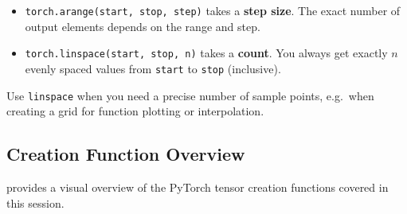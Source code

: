 \documentclass[12pt,a4paper]{article}
\newcommand{\tbf}[1]{\textbf{#1}}
\newcommand{\ttt}[1]{\texttt{#1}}
\begin{document}
\begin{example}[title=\ttt{arange} vs.\ \ttt{linspace}]
\begin{itemize}[leftmargin=*]
  \item \ttt{torch.arange(start, stop, step)} takes a \tbf{step size}. The
        exact number of output elements depends on the range and step.
  \item \ttt{torch.linspace(start, stop, n)} takes a \tbf{count}. You always
        get exactly $n$ evenly spaced values from \ttt{start} to \ttt{stop}
        (inclusive).
\end{itemize}
Use \ttt{linspace} when you need a precise number of sample points, e.g.\
when creating a grid for function plotting or interpolation.
\end{example}

\subsection{Creation Function Overview}

 provides a visual overview of the PyTorch tensor
creation functions covered in this session.
\end{document}
